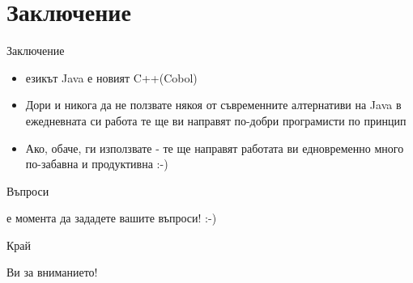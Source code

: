 \documentclass[compress,red]{beamer}
\begin{document}
\section{Заключение}

\begin{frame}{Заключение}
  \transdissolve
  \begin{itemize}
  \item езикът Java е новият C++(Cobol)
  \item Дори и никога да не ползвате някоя от съвременните алтернативи
    на Java в ежедневната си работа те ще ви направят по-добри
    програмисти по принцип
  \item Ако, обаче, ги използвате - те ще направят работата ви
    едновременно много по-забавна и продуктивна :-)
  \end{itemize}
\end{frame}


\begin{frame}{Въпроси}
  \transdissolve
  \begin{center}
     е момента да зададете вашите въпроси! :-)
  \end{center}
\end{frame}


\begin{frame}{Край}
  \transdissolve
  \begin{center}
     Ви за вниманието!
  \end{center}
  
\end{frame}
\end{document}
